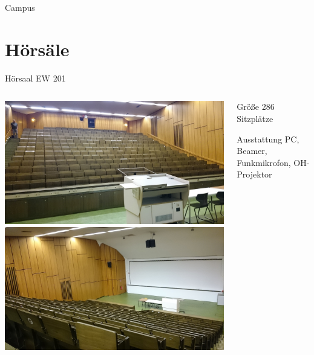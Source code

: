 \documentclass[compress,]{beamer}
\begin{document}
\begin{frame}{Campus}
\end{frame}


\section{Hörsäle}
\begin{frame}{Hörsaal EW 201}
  \begin{columns}[onlytextwidth]
    \begin{column}{0.5\textwidth}
      \includegraphics[width=\textwidth]{images/DSC_0712.JPG}\\
      \includegraphics[width=\textwidth]{images/DSC_0711.JPG}
    \end{column}
    \begin{column}{0.4\textwidth}
      \begin{block}{Größe}
        286 Sitzplätze
      \end{block}
      \vspace{1cm}
      \begin{block}{Ausstattung}
        PC, Beamer, Funkmikrofon, OH-Projektor
      \end{block}
    \end{column}
  \end{columns}
\end{frame}
\end{document}

